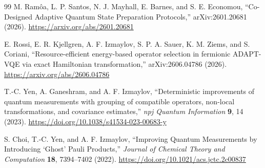 \documentclass[11pt]{article}
\begin{document}
\begin{thebibliography}{99}
M. Ram\^oa, L. P. Santos, N. J. Mayhall, E. Barnes, and S. E. Economou,
``Co-Designed Adaptive Quantum State Preparation Protocols,''
arXiv:2601.20681 (2026).
\url{https://arxiv.org/abs/2601.20681}

E. Rossi, E. R. Kjellgren, A. F. Izmaylov, S. P. A. Sauer, K. M. Ziems, and S. Coriani,
``Resource-efficient energy-based operator selection in fermionic ADAPT-VQE via exact Hamiltonian transformation,''
arXiv:2606.04786 (2026).
\url{https://arxiv.org/abs/2606.04786}



T.-C. Yen, A. Ganeshram, and A. F. Izmaylov,
``Deterministic improvements of quantum measurements with grouping of compatible operators, non-local transformations, and covariance estimates,''
\emph{npj Quantum Information} \textbf{9}, 14 (2023).
\url{https://doi.org/10.1038/s41534-023-00683-y}

S. Choi, T.-C. Yen, and A. F. Izmaylov,
``Improving Quantum Measurements by Introducing `Ghost' Pauli Products,''
\emph{Journal of Chemical Theory and Computation} \textbf{18}, 7394--7402 (2022).
\url{https://doi.org/10.1021/acs.jctc.2c00837}

\end{thebibliography}
\end{document}
